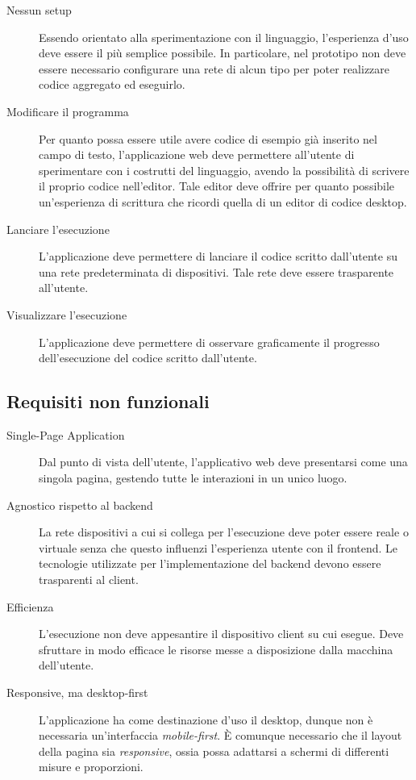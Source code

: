       \begin{description}
        \item[Nessun setup]
          Essendo orientato alla sperimentazione con il linguaggio, l'esperienza d'uso deve essere il più semplice possibile.
          In particolare, nel prototipo non deve essere necessario configurare una rete di alcun tipo per poter realizzare codice aggregato ed eseguirlo.
        \item[Modificare il programma]
          Per quanto possa essere utile avere codice di esempio già inserito nel campo di testo, l'applicazione web deve permettere all'utente di sperimentare con i costrutti del linguaggio, avendo la possibilità di scrivere il proprio codice nell'editor.
          Tale editor deve offrire per quanto possibile un'esperienza di scrittura che ricordi quella di un editor di codice desktop.
        \item[Lanciare l'esecuzione]
          L'applicazione deve permettere di lanciare il codice scritto dall'utente su una rete predeterminata di dispositivi.
          Tale rete deve essere trasparente all'utente.
        \item[Visualizzare l'esecuzione]
          L'applicazione deve permettere di osservare graficamente il progresso dell'esecuzione del codice scritto dall'utente.
      \end{description}

    \subsection{Requisiti non funzionali}

      \begin{description}
        \item[Single-Page Application]
          Dal punto di vista dell'utente, l'applicativo web deve presentarsi come una singola pagina, gestendo tutte le interazioni in un unico luogo.
        \item[Agnostico rispetto al backend]
          La rete dispositivi a cui si collega per l'esecuzione deve poter essere reale o virtuale senza che questo influenzi l'esperienza utente con il frontend.
          Le tecnologie utilizzate per l'implementazione del backend devono essere trasparenti al client.
        \item[Efficienza]
          L'esecuzione non deve appesantire il dispositivo client su cui esegue.
          Deve sfruttare in modo efficace le risorse messe a disposizione dalla macchina dell'utente. %
        \item[Responsive, ma desktop-first]
          L'applicazione ha come destinazione d'uso il desktop, dunque non è necessaria un'interfaccia \emph{mobile-first}.
          È comunque necessario che il layout della pagina sia \emph{responsive}, ossia possa adattarsi a schermi di differenti misure e proporzioni.
      \end{description}

